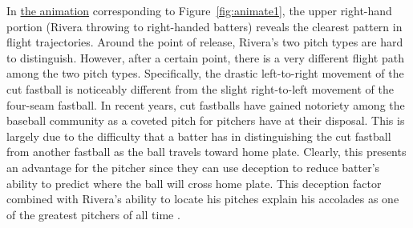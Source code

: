 \begin{article}
In \href{http://cpsievert.github.io/pitchRx/ani1}{the animation}
corresponding to Figure~\ref{fig:animate1}, the upper right-hand
portion (Rivera throwing to right-handed batters) reveals the clearest
pattern in flight trajectories. Around the point of release, Rivera's
two pitch types are hard to distinguish. However, after a certain
point, there is a very different flight path among the two pitch types.
Specifically, the drastic left-to-right movement of the cut fastball
is noticeably different from the slight right-to-left movement of
the four-seam fastball. In recent years, cut fastballs have gained
notoriety among the baseball community as a coveted pitch for pitchers
have at their disposal. This is largely due to the difficulty that
a batter has in distinguishing the cut fastball from another fastball
as the ball travels toward home plate. Clearly, this presents an advantage
for the pitcher since they can use deception to reduce batter's ability
to predict where the ball will cross home plate. This deception factor
combined with Rivera's ability to locate his pitches explain his accolades
as one of the greatest pitchers of all time \citep{NYT}.


\end{article}
